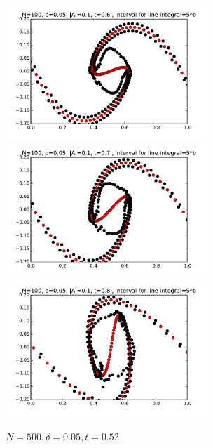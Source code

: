 \documentclass[12pt,twoside]{article}
\begin{document}
\begin{figure}[ht]
\begin{minipage}[b]{0.45\linewidth}
\includegraphics[width=3in,height=2in]{t06.pdf}
\includegraphics[width=3in,height=2in]{t07.pdf}
\includegraphics[width=3in,height=2in]{t08.pdf}
\caption{$N=500 , \delta=0.05 ,  t=0.52$ }
\end{minipage}
\end{figure}
\end{document}
